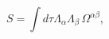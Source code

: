 \begin{equation} \label{7.1}
S= \int d \tau \Lambda_\alpha \Lambda_\beta\, \Omega^{\alpha
\beta},
\end{equation}

